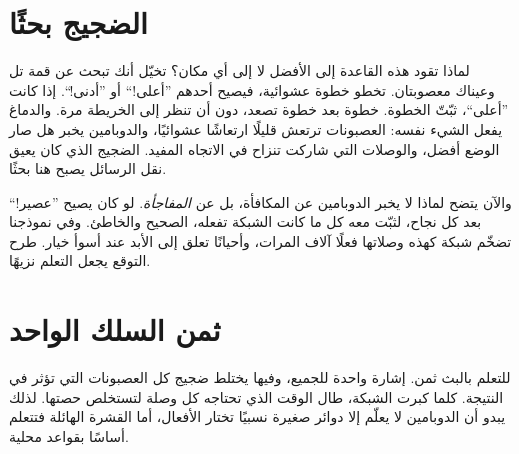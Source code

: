 
\section*{الضجيج بحثًا}

لماذا تقود هذه القاعدة إلى الأفضل لا إلى أي مكان؟ تخيّل أنك تبحث عن قمة تل وعيناك معصوبتان. تخطو خطوة عشوائية، فيصيح أحدهم ”أعلى!“ أو ”أدنى!“. إذا كانت ”أعلى“، ثبّتّ الخطوة. خطوة بعد خطوة تصعد، دون أن تنظر إلى الخريطة مرة. والدماغ يفعل الشيء نفسه: العصبونات ترتعش قليلًا ارتعاشًا عشوائيًا، والدوبامين يخبر هل صار الوضع أفضل، والوصلات التي شاركت تنزاح في الاتجاه المفيد. الضجيج الذي كان يعيق نقل الرسائل يصبح هنا بحثًا.

والآن يتضح لماذا لا يخبر الدوبامين عن المكافأة، بل عن \emph{المفاجأة}. لو كان يصيح ”عصير!“ بعد كل نجاح، لثبّت معه كل ما كانت الشبكة تفعله، الصحيح والخاطئ. وفي نموذجنا تضخّم شبكة كهذه وصلاتها فعلًا آلاف المرات، وأحيانًا تعلق إلى الأبد عند أسوأ خيار. طرح التوقع يجعل التعلم نزيهًا.

\section*{ثمن السلك الواحد}

للتعلم بالبث ثمن. إشارة واحدة للجميع، وفيها يختلط ضجيج كل العصبونات التي تؤثر في النتيجة. كلما كبرت الشبكة، طال الوقت الذي تحتاجه كل وصلة لتستخلص حصتها. لذلك يبدو أن الدوبامين لا يعلّم إلا دوائر صغيرة نسبيًا تختار الأفعال، أما القشرة الهائلة فتتعلم أساسًا بقواعد محلية.

